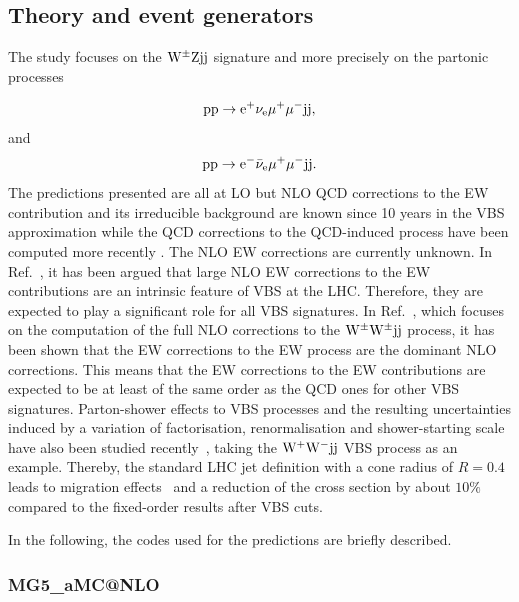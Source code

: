 \documentclass[11pt]{cernrep}
\makeatletter
\newcommand{\MGaMC}{M\protect\scalebox{0.8}{AD}G\protect\scalebox{0.8}{RAPH}5\_aMC@NLO\xspace}
\makeatother
\begin{document}
\subsection{Theory and event generators \label{vbs_theory}}

The study focuses on the ${\rm W}^{\pm}{\rm Z}{\rm j}{\rm j}$ signature and more precisely on the partonic processes

\begin{equation}
 {\rm p} {\rm p} \to {\rm e}^+  \nu_{\rm e}  \mu^+ \mu^- {\rm j} {\rm j} ,
\end{equation}
%
and
%
\begin{equation}
 {\rm p} {\rm p} \to {\rm e}^-  \bar \nu_{\rm e}  \mu^+ \mu^- {\rm j} {\rm j}.
\end{equation}
%
The predictions presented are all at LO but NLO QCD corrections to the EW contribution and its irreducible background are known since 10 years in the VBS approximation \cite{Bozzi:2007ur} while the QCD corrections to the QCD-induced process have been computed more recently \cite{Campanario:2013qba}.
The NLO EW corrections are currently unknown.
In Ref.~\cite{Biedermann:2016yds}, it has been argued that large NLO EW corrections to the EW contributions are an intrinsic feature of VBS at the LHC.
Therefore, they are expected to play a significant role for all VBS signatures.
In Ref.~\cite{Biedermann:2017bss}, which focuses on the computation of the full NLO corrections to the ${\rm W}^\pm{\rm W}^\pm{\rm j}{\rm j}$ process, it has been shown that the EW corrections to the EW process are the dominant NLO corrections.
This means that the EW corrections to the EW contributions are expected to be at least of the same order as the QCD ones for other VBS signatures.
Parton-shower effects to VBS processes and the resulting uncertainties
induced by a variation of factorisation, renormalisation and
shower-starting scale have also been studied
recently~\cite{Rauch:2016upa,Rauch:2016pai}, taking the ${\rm W}^+{\rm
W}^-{\rm j}{\rm j}$ VBS process as an example. Thereby, the standard LHC
jet definition with a cone radius of $R{=}0.4$ leads to migration
effects~\cite{Rauch:2017cfu} and a reduction of the cross section by about $10\%$ compared to
the fixed-order results after VBS cuts.

In the following, the codes used for the predictions are briefly described.

\subsubsection*{\protect\MGaMC \label{vbs_mgamc}}
\end{document}
